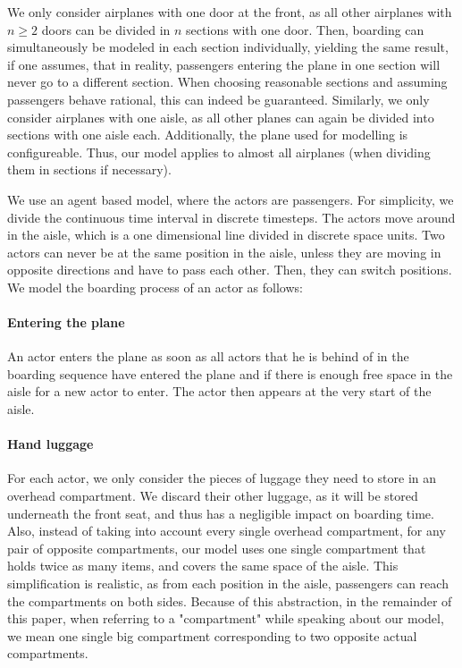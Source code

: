 \documentclass[11pt]{article}
\begin{document}
We only consider airplanes with one door at the front, as all other airplanes with $n \geq 2$ doors can be divided in $n$ sections with one door. Then, boarding can simultaneously be modeled in each section individually, yielding the same result, if one assumes, that in reality, passengers entering the plane in one section will never go to a different section.
When choosing reasonable sections and assuming passengers behave rational, this can indeed be guaranteed. Similarly, we only consider airplanes with one aisle, as all other planes can again be divided into sections with one aisle each. Additionally, the plane used for modelling is configureable. Thus, our model applies to almost all airplanes (when dividing them in sections if necessary).

We use an agent based model, where the actors are passengers. For simplicity, we divide the continuous time interval in discrete timesteps. The actors move around in the aisle, which is a one dimensional line divided in discrete space units. Two actors can never be at the same position in the aisle, unless they are moving in opposite directions and have to pass each other. Then, they can switch positions. We model the boarding process of an actor as follows:

\paragraph{Entering the plane}
An actor enters the plane as soon as all actors that he is behind of in the boarding sequence  have entered the plane and if there is enough free space in the aisle for a new actor to enter. The actor then appears at the very start of the aisle.


\paragraph{Hand luggage}
For each actor, we only consider the pieces of luggage they need to store in an overhead compartment. We discard their other luggage, as it will be stored underneath the front seat, and thus has a negligible impact on boarding time. Also, instead of taking into account every single overhead compartment, for any pair of opposite compartments, our model uses one single compartment that holds twice as many items, and covers the same space of the aisle. This simplification is realistic, as from each position in the aisle, passengers can reach the compartments on both sides. Because of this abstraction, in the remainder of this paper, when referring to a "compartment" while speaking about our model, we mean one single big compartment corresponding to two opposite actual compartments.
\end{document}
